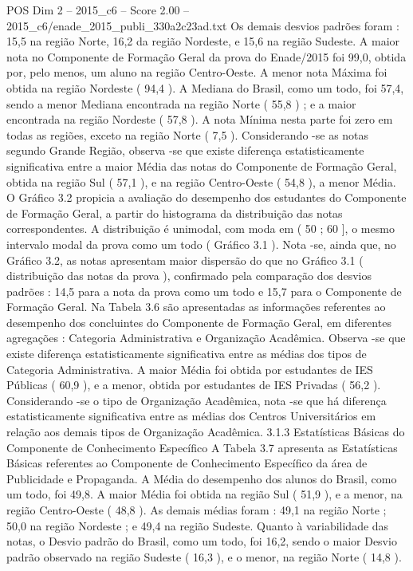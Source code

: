 \begin{textsample}{POS Dim 2 – 2015\_c6 – Score 2.00 – 2015\_c6/enade\_2015\_publi\_330a2c23ad.txt}
Os demais desvios padrões foram : 15,5 na região Norte, 16,2 da região Nordeste, e 15,6 na região Sudeste.
A maior nota no Componente de Formação Geral da prova do Enade/2015 foi 99,0, obtida por, pelo menos, um aluno na região Centro-Oeste.
A menor nota Máxima foi obtida na região Nordeste ( 94,4 ).
A Mediana do Brasil, como um todo, foi 57,4, sendo a menor Mediana encontrada na região Norte ( 55,8 ) ; e a maior encontrada na região Nordeste ( 57,8 ).
A nota Mínima nesta parte foi zero em todas as regiões, exceto na região Norte ( 7,5 ).
Considerando -se as notas segundo Grande Região, observa -se que existe diferença estatisticamente significativa entre a maior Média das notas do Componente de Formação Geral, obtida na região Sul ( 57,1 ), e na região Centro-Oeste ( 54,8 ), a menor Média.
O Gráfico 3.2 propicia a avaliação do desempenho dos estudantes do Componente de Formação Geral, a partir do histograma da distribuição das notas correspondentes.
A distribuição é unimodal, com moda em ( 50 ; 60 ], o mesmo intervalo modal da prova como um todo ( Gráfico 3.1 ).
Nota -se, ainda que, no Gráfico 3.2, as notas apresentam maior dispersão do que no Gráfico 3.1 ( distribuição das notas da prova ), confirmado pela comparação dos desvios padrões : 14,5 para a nota da prova como um todo e 15,7 para o Componente de Formação Geral.
Na Tabela 3.6 são apresentadas as informações referentes ao desempenho dos concluintes do Componente de Formação Geral, em diferentes agregações : Categoria Administrativa e Organização Acadêmica.
Observa -se que existe diferença estatisticamente significativa entre as médias dos tipos de Categoria Administrativa.
A maior Média foi obtida por estudantes de IES Públicas ( 60,9 ), e a menor, obtida por estudantes de IES Privadas ( 56,2 ).
Considerando -se o tipo de Organização Acadêmica, nota -se que há diferença estatisticamente significativa entre as médias dos Centros Universitários em relação aos demais tipos de Organização Acadêmica. 3.1.3 Estatísticas Básicas do Componente de Conhecimento Específico A Tabela 3.7 apresenta as Estatísticas Básicas referentes ao Componente de Conhecimento Específico da área de Publicidade e Propaganda.
A Média do desempenho dos alunos do Brasil, como um todo, foi 49,8.
A maior Média foi obtida na região Sul ( 51,9 ), e a menor, na região Centro-Oeste ( 48,8 ).
As demais médias foram : 49,1 na região Norte ; 50,0 na região Nordeste ; e 49,4 na região Sudeste.
Quanto à variabilidade das notas, o Desvio padrão do Brasil, como um todo, foi 16,2, sendo o maior Desvio padrão observado na região Sudeste ( 16,3 ), e o menor, na região Norte ( 14,8 ).

\end{textsample}
